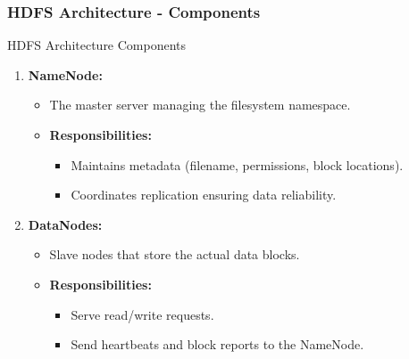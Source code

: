 \documentclass[aspectratio=169]{beamer}
\begin{document}
\begin{frame}[fragile]
    \frametitle{HDFS Architecture - Components}
    \begin{block}{HDFS Architecture Components}
        \begin{enumerate}
            \item \textbf{NameNode:}
                \begin{itemize}
                    \item The master server managing the filesystem namespace.
                    \item \textbf{Responsibilities:}
                        \begin{itemize}
                            \item Maintains metadata (filename, permissions, block locations).
                            \item Coordinates replication ensuring data reliability.
                        \end{itemize}
                \end{itemize}
                
            \item \textbf{DataNodes:}
                \begin{itemize}
                    \item Slave nodes that store the actual data blocks.
                    \item \textbf{Responsibilities:}
                        \begin{itemize}
                            \item Serve read/write requests.
                            \item Send heartbeats and block reports to the NameNode.
                        \end{itemize}
                \end{itemize}
        \end{enumerate}
    \end{block}
\end{frame}
\end{document}
